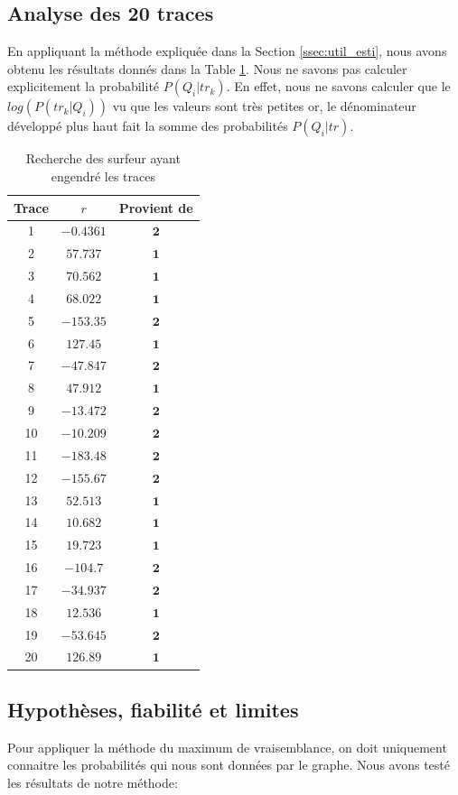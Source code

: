 \documentclass[a4paper,titlepage]{report}
\begin{document}
\subsection{Analyse des 20 traces}
En appliquant la méthode expliquée dans la Section \ref{ssec:util_esti}, nous avons obtenu les résultats donnés dans la Table \ref{tab:surf_trace}. Nous ne savons pas calculer explicitement la probabilité $ P(Q_i|tr_k)$. En effet, nous ne savons calculer que le $log( P(tr_k|Q_i) )$ vu que les valeurs sont très petites or, le dénominateur développé plus haut fait la somme des probabilités  $ P(Q_i|tr)$.  
\begin{table}[ht]
	\center
	\begin{tabular}{|c|cc|}
		\hline
		Trace & $r$ & Provient de \\
		\hline
		1 & $ -0.4361$ & $\mathbf{2}$ \\
		2 & $57.737$ & $\mathbf{1}$ \\
		3 & $70.562$ & $\mathbf{1}$ \\
		4 & $68.022$ & $\mathbf{1}$ \\
		5 & $-153.35$ & $\mathbf{2}$ \\
		6 & $127.45$ & $\mathbf{1}$ \\
		7 & $-47.847$ & $\mathbf{2}$ \\
		8 & $47.912$ & $\mathbf{1}$ \\
		9 & $-13.472$ & $\mathbf{2}$ \\
		10 & $-10.209$ & $\mathbf{2}$ \\
		11 & $-183.48$ & $\mathbf{2}$ \\
		12 & $-155.67$ & $\mathbf{2}$ \\
		13 & $52.513$ & $\mathbf{1}$ \\
		14 & $10.682$ & $\mathbf{1}$ \\
		15 & $19.723$ & $\mathbf{1}$ \\
		16 & $-104.7$ & $\mathbf{2}$ \\
		17 & $-34.937$ & $\mathbf{2}$ \\
		18 & $12.536$ & $\mathbf{1}$ \\
		19 & $-53.645$ & $\mathbf{2}$ \\
		20 & $126.89$ & $\mathbf{1}$ \\
		\hline
	\end{tabular}
	\caption{Recherche des surfeur ayant engendré les traces}
	\label{tab:surf_trace}
\end{table}
\subsection{Hypothèses, fiabilité et limites}
Pour appliquer la méthode du maximum de vraisemblance, on doit uniquement connaitre les probabilités qui nous sont données par le graphe. Nous avons testé les résultats de notre méthode: 
\end{document}
